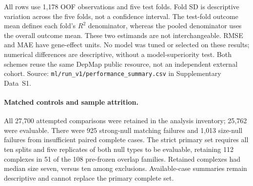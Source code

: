 \documentclass[11pt,letterpaper]{article}
\begin{document}
\renewcommand{\thetable}{S\arabic{table}}
\setcounter{table}{1}
\begin{table}[htbp]
\centering
\small
\caption{\textbf{Fixed-model prediction with patient- and lineage-group holdout.}}
\label{tab:sr_r15_ml}
\par\smallskip
\begin{minipage}{\textwidth}
\footnotesize
All rows use 1{,}178 OOF observations and five test folds. Fold SD is descriptive
variation across the five folds, not a confidence interval. The test-fold
outcome mean defines each fold's $R^2$ denominator, whereas the pooled
denominator uses the overall outcome mean. These two estimands are not
interchangeable. RMSE and MAE have gene-effect units. No model was tuned or
selected on these results; numerical differences are descriptive, without
a model-superiority test. Both schemes reuse the same DepMap public resource,
not an independent external cohort. Source:
\texttt{ml/run\_v1/performance\_summary.csv} in Supplementary Data~S1.
\end{minipage}
\end{table}

\paragraph{Matched controls and sample attrition.}
All 27{,}700 attempted comparisons were retained in the analysis inventory;
25{,}762 were evaluable. There were 925 strong-null
matching failures and 1{,}013 size-null failures from insufficient paired
complete cases. The strict primary set requires all ten splits and five
replicates of both null types to be evaluable, retaining 112 complexes in
51 of the 108 pre-frozen overlap families. Retained complexes had median
size seven, versus ten among exclusions. Available-case summaries remain
descriptive and cannot replace the primary complete set.
\end{document}
